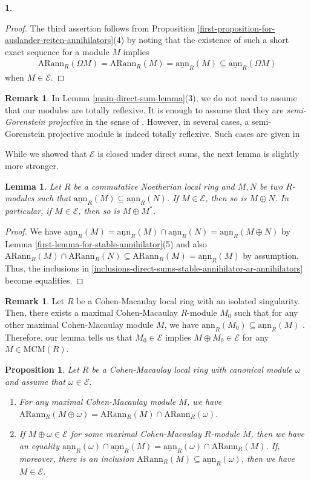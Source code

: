 \documentclass[12pt]{amsart}
\newcommand{\sann}{\underline{\mathrm{ann}}}
\newcommand{\arann}{\mathrm{ARann}}
\newcommand{\MCM}{\mathrm{MCM}}
\newcommand{\EE}{\mathcal{E}}
\newtheorem{lemma}[theorem]{Lemma}
\newtheorem{proposition}[theorem]{Proposition}
\theoremstyle{definition}
\newtheorem{remark}[theorem]{Remark}
\newtheorem{chunk}[theorem]{}
\numberwithin{equation}{theorem}
\begin{document}
\begin{chunk}
\begin{proof}
        The third assertion follows from Proposition \ref{first-proposition-for-auslander-reiten-annihilators}(4) by noting that the existence of such a short exact sequence for a module $M$ implies
        \begin{align*}
            \arann_R(\Omega M) = \arann_R(M) = \sann_R(M) \subseteq \sann_R(\Omega M)
        \end{align*}
        when $M \in \EE$.
    \end{proof}
    \begin{remark}
        In Lemma \ref{main-direct-sum-lemma}(3), we do not need to assume that our modules are totally reflexive. It is enough to assume that they are \textit{semi-Gorenstein projective} in the sense of \cite{ringel-zhang}. However, in several cases, a semi-Gorenstein projective module is indeed totally reflexive. Such cases are given in 
    \end{remark}
While we showed that $\EE$ is closed under direct sums, the next lemma is slightly more stronger.
    \begin{lemma}\label{another-lemma-on-direct-sum}
        Let $R$ be a commutative Noetherian local ring and $M,N$ be two $R$-modules such that $\sann_R(M) \subseteq \sann_R(N)$. If $M \in \EE$, then so is $M \oplus N$. In particular, if $M \in \EE$, then so is $M \oplus M^*$.
    \end{lemma}
    \begin{proof}
        We have $\sann_R(M) = \sann_R(M) \cap \sann_R(N) = \sann_R(M\oplus N)$ by Lemma \ref{first-lemma-for-stable-annihilator}(5) and also $\arann_R(M) \cap \arann_R(N) \subseteq \arann_R(M) = \sann_R(M) $ by assumption. Thus, the inclusions in \ref{inclusions-direct-sums-stable-annihilator-ar-annihilators} become equalities.
    \end{proof}

    \begin{remark}\label{minimal-stable-annihilator}
        Let $R$ be a Cohen-Macaulay local ring with an isolated singularity. Then, there exists a maximal Cohen-Macaulay $R$-module $M_0$ such that for any other maximal Cohen-Macaulay module $M$, we have $\sann_R(M_0) \subseteq \sann_R(M)$ \cite[Theorem 1.2]{Kimura}. Therefore, our lemma tells us that $M_0 \in \EE$ implies $M \oplus M_0 \in \EE$ for any $M \in \MCM(R)$.
    \end{remark}

    \begin{proposition}
        Let $R$ be a Cohen-Macaulay local ring with canonical module $\omega$ and assume that $\omega \in \EE$.
        \begin{enumerate}
            \item For any maximal Cohen-Macaulay module $M$, we have $\arann_R(M \oplus \omega) =  \arann_R(M) \cap \arann_R(\omega)$.
            \item If $M \oplus \omega \in \EE$ for some maximal Cohen-Macaulay $R$-module $M$, then we have an equality $\sann_R(\omega) \cap \sann_R(M) = \sann_R(\omega) \cap \arann_R(M)$. If, moreover, there is an inclusion $\arann_R(M) \subseteq \sann_R(\omega) $, then we have $M \in \EE$.
        \end{enumerate}
        

\end{proposition}
\end{chunk}
\end{document}
